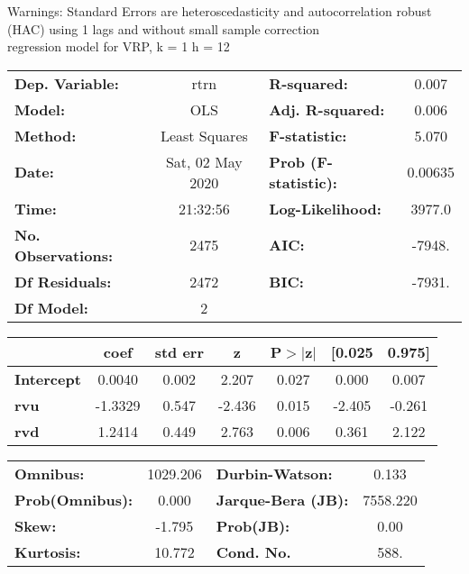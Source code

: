 Warnings: \newline
 [1] Standard Errors are heteroscedasticity and autocorrelation robust (HAC) using 1 lags and without small sample correction\\ 

regression model for VRP, k = 1 h = 12\begin{center}
\begin{tabular}{lclc}
\toprule
\textbf{Dep. Variable:}    &       rtrn       & \textbf{  R-squared:         } &     0.007   \\
\textbf{Model:}            &       OLS        & \textbf{  Adj. R-squared:    } &     0.006   \\
\textbf{Method:}           &  Least Squares   & \textbf{  F-statistic:       } &     5.070   \\
\textbf{Date:}             & Sat, 02 May 2020 & \textbf{  Prob (F-statistic):} &  0.00635    \\
\textbf{Time:}             &     21:32:56     & \textbf{  Log-Likelihood:    } &    3977.0   \\
\textbf{No. Observations:} &        2475      & \textbf{  AIC:               } &    -7948.   \\
\textbf{Df Residuals:}     &        2472      & \textbf{  BIC:               } &    -7931.   \\
\textbf{Df Model:}         &           2      & \textbf{                     } &             \\
\bottomrule
\end{tabular}
\begin{tabular}{lcccccc}
                   & \textbf{coef} & \textbf{std err} & \textbf{z} & \textbf{P$> |$z$|$} & \textbf{[0.025} & \textbf{0.975]}  \\
\midrule
\textbf{Intercept} &       0.0040  &        0.002     &     2.207  &         0.027        &        0.000    &        0.007     \\
\textbf{rvu}       &      -1.3329  &        0.547     &    -2.436  &         0.015        &       -2.405    &       -0.261     \\
\textbf{rvd}       &       1.2414  &        0.449     &     2.763  &         0.006        &        0.361    &        2.122     \\
\bottomrule
\end{tabular}
\begin{tabular}{lclc}
\textbf{Omnibus:}       & 1029.206 & \textbf{  Durbin-Watson:     } &    0.133  \\
\textbf{Prob(Omnibus):} &   0.000  & \textbf{  Jarque-Bera (JB):  } & 7558.220  \\
\textbf{Skew:}          &  -1.795  & \textbf{  Prob(JB):          } &     0.00  \\
\textbf{Kurtosis:}      &  10.772  & \textbf{  Cond. No.          } &     588.  \\
\bottomrule
\end{tabular}
\end{center}

